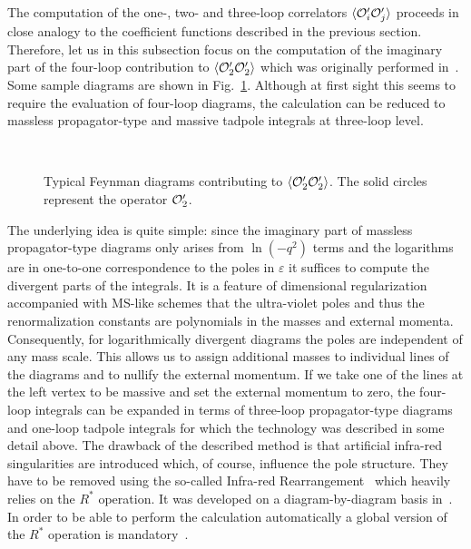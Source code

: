 The computation of the one-, two- and three-loop correlators
$\langle{\cal O}_i^\prime{\cal O}_j^\prime\rangle$ proceeds in close
analogy to the coefficient functions described in the previous section.
Therefore, let us in this subsection focus on the computation of the
imaginary part of the four-loop contribution to $\langle{\cal
  O}_2^\prime{\cal O}_2^\prime\rangle$ which was originally performed
in~\cite{Che97higgs}. Some sample diagrams are shown in
Fig.~\ref{figo2o2}. Although at first sight this seems to require the
evaluation of four-loop diagrams, the calculation can be reduced to
massless propagator-type and massive tadpole integrals at three-loop level.
%
\begin{figure}[t]
  \begin{center}
    \leavevmode
    \epsfxsize=14.0cm
    \\
    \parbox{\captionwidth}{
      \caption{\label{figo2o2}
        Typical Feynman diagrams contributing to
        $\langle{\cal O}_2^\prime{\cal O}_2^\prime\rangle$.
        The solid circles represent the operator
        ${\cal O}_2^\prime$.}}
  \end{center}
\end{figure}
%
%
The underlying idea is quite simple: since the imaginary part of
massless propagator-type diagrams only arises from $\ln(-q^2)$ terms and
the logarithms are in one-to-one correspondence to the poles in
$\varepsilon$ it suffices to compute the divergent parts of the
integrals. It is a feature of dimensional regularization accompanied
with MS-like schemes that the ultra-violet poles and thus the
renormalization constants are polynomials in the masses and external
momenta.  Consequently, for logarithmically divergent diagrams the poles
are independent of any mass scale.  This allows us to assign additional
masses to individual lines of the diagrams and to nullify the external
momentum.  If we take one of the lines at the left vertex to be massive
and set the external momentum to zero, the four-loop integrals can be
expanded in terms of three-loop propagator-type diagrams and one-loop
tadpole integrals for which the technology was described in some detail
above.  The drawback of the described method is that artificial
infra-red singularities are introduced which, of course, influence the
pole structure. They have to be removed using the so-called Infra-red
Rearrangement~\cite{Vla80CheKatTka80} which heavily relies on the
$R^*$ operation.  It was developed on a diagram-by-diagram basis
in~\cite{CheSmi84}.  In order to be able to perform the calculation
automatically a global version of the $R^*$ operation is
mandatory~\cite{Che97R,Che97higgs,Che97radcor96}.

